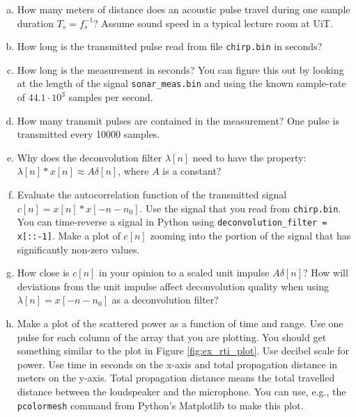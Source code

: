 \begin{enumerate}[a)]
\item How many meters of distance does an acoustic pulse travel during one sample duration $T_s = f_s^{-1}$? Assume sound speed in a typical lecture room at UiT.

  \item How long is the transmitted pulse read from file \verb|chirp.bin| in seconds?  

  \item How long is the measurement in seconds? You can figure this out by looking at the length of the signal \verb|sonar_meas.bin| and using the known sample-rate of $44.1 \cdot 10^3$ samples per second.
    
  \item How many transmit pulses are contained in the measurement? One
    pulse is transmitted every 10000 samples.
    
 \item Why does the deconvolution filter $\lambda[n]$ need to have the
  property: $\lambda[n]*x[n] \approx A\delta[n]$, where $A$ is a
  constant?
   
 \item Evaluate the autocorrelation function of the transmitted signal
   $c[n]=x[n]*x[-n-n_0]$. Use the signal that you read from
   \verb|chirp.bin|. You can time-reverse a signal in Python using
   \verb|deconvolution_filter = x[::-1]|. Make a plot of $c[n]$
   zooming into the portion of the signal that has significantly
   non-zero values.

 \item How close is $c[n]$ in your opinion to a scaled unit
   impulse $A\delta[n]$? How will deviations from the unit impulse
   affect deconvolution quality when using $\lambda[n]=x[-n-n_0]$ as a
   deconvolution filter?

 \item Make a plot of the scattered power as a function of time and
   range. Use one pulse for each column of the array that you are
   plotting.  You should get something similar to the plot in Figure
   \ref{fig:ex_rti_plot}. Use decibel scale for power. Use time in
   seconds on the x-axis and total propagation distance in meters on
   the y-axis. Total propagation distance means the total travelled
   distance between the loudspeaker and the microphone. You can use,
   e.g., the \verb|pcolormesh| command from Python's Matplotlib to
   make this plot.


\end{enumerate}
